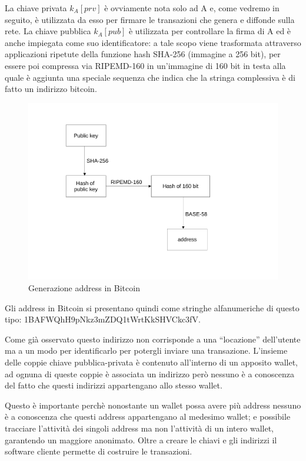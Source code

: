 La chiave privata $k_A [prv]$ è ovviamente nota solo ad A e, come vedremo in seguito, è utilizzata da esso per ﬁrmare le transazioni che genera e diﬀonde sulla rete. La chiave pubblica $k_A [pub]$ è utilizzata per controllare la ﬁrma di A ed è anche impiegata come suo identiﬁcatore: a tale scopo viene trasformata attraverso applicazioni ripetute della funzione hash SHA-256 (immagine a 256 bit), per essere poi compressa via RIPEMD-160 in un’immagine di 160 bit in testa alla quale è aggiunta una speciale sequenza che indica che la stringa complessiva è di fatto un indirizzo bitcoin.
\begin{figure}[h!]
    \centering
    \includegraphics[scale=0.5, trim = 1cm 2cm 0cm 2cm, clip]{Images/address_gen.pdf}
    \caption{Generazione address in Bitcoin}
    \label{fig:sha-256_address}
\end{figure}
\FloatBarrier
Gli address in Bitcoin si presentano quindi come stringhe alfanumeriche di questo tipo: 1BAFWQhH9pNkz3mZDQ1tWrtKkSHVCkc3fV.

Come già osservato questo indirizzo non corrisponde a una “locazione” dell'utente ma a un modo per identiﬁcarlo per potergli inviare una transazione. L'insieme delle coppie chiave pubblica-privata è contenuto all'interno di un apposito wallet, ad ognuna di queste coppie è associata un indirizzo però nessuno è a conoscenza del fatto che questi indirizzi appartengano allo stesso wallet.

Questo è importante perchè nonostante un wallet possa avere più address nessuno è a conoscenza che questi address appartengano al medesimo wallet; e possibile tracciare l’attività dei singoli address ma non l’attività di un intero wallet, garantendo un maggiore anonimato. Oltre a creare le chiavi e gli indirizzi il software cliente permette di costruire le transazioni.

